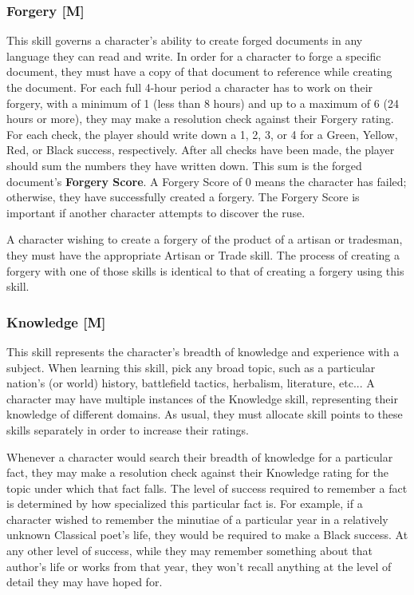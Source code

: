 \documentclass[oneside]{book}
\begin{document}
\begin{multicols}{2}
\subsubsection{Forgery [M]}
This skill governs a character's ability to create forged documents in any language they can read and write. In order for a character to forge a specific document, they must have a copy of that document to reference while creating the document. For each full 4-hour period a character has to work on their forgery, with a minimum of 1 (less than 8 hours) and up to a maximum of 6 (24 hours or more), they may make a resolution check against their Forgery rating. For each check, the player should write down a 1, 2, 3, or 4 for a Green, Yellow, Red, or Black success, respectively. After all checks have been made, the player should sum the numbers they have written down. This sum is the forged document's \textbf{Forgery Score}. A Forgery Score of 0 means the character has failed; otherwise, they have successfully created a forgery. The Forgery Score is important if another character attempts to discover the ruse.

A character wishing to create a forgery of the product of a artisan or tradesman, they must have the appropriate Artisan or Trade skill. The process of creating a forgery with one of those skills is identical to that of creating a forgery using this skill.
\subsubsection{Knowledge [M]}
This skill represents the character's breadth of knowledge and experience with a subject. When learning this skill, pick any broad topic, such as a particular nation's (or world) history, battlefield tactics, herbalism, literature, etc... A character may have multiple instances of the Knowledge skill, representing their knowledge of different domains. As usual, they must allocate skill points to these skills separately in order to increase their ratings.

Whenever a character would search their breadth of knowledge for a particular fact, they may make a resolution check against their Knowledge rating for the topic under which that fact falls. The level of success required to remember a fact is determined by how specialized this particular fact is. For example, if a character wished to remember the minutiae of a particular year in a relatively unknown Classical poet's life, they would be required to make a Black success. At any other level of success, while they may remember something about that author's life or works from that year, they won't recall anything at the level of detail they may have hoped for.


\end{multicols}
\end{document}
